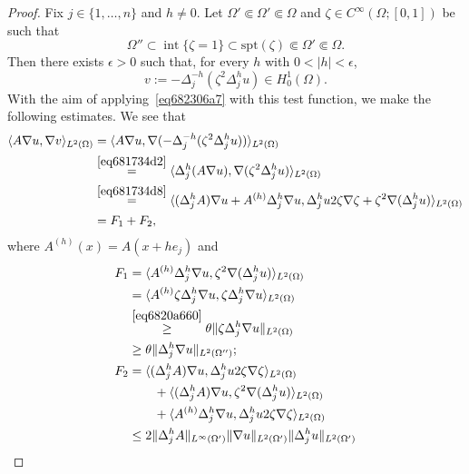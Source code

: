 \documentclass[a4paper,9pt]{amsart}
\newcommand{\spt}{\mathrm{spt}}
\newcommand{\grad}{\nabla}
\newcommand{\interior}{\operatorname{int}}
\theoremstyle{plain}
\theoremstyle{definition}
\theoremstyle{remark}
\begin{document}
\begin{proof}
	 Fix $j\in\{1,\dots,n\}$ and $h\neq0$.
	 Let $\Omega'\Subset\Omega'\Subset\Omega$ and $\zeta\in C^\infty(\Omega;[0,1])$ be such that
	\begin{equation}
		\Omega'' \subset\interior\{\zeta=1\} \subset\spt(\zeta) \Subset \Omega' \Subset\Omega .
	\end{equation}
	Then there exists $\epsilon>0$ such that, for every $h$ with $0<|h|<\epsilon$,
	\begin{equation}
		v := -\Delta_j^{-h} (\zeta^2 \Delta_j^h u) \in H^1_0(\Omega) .
	\end{equation}
	With the aim of applying~\eqref{eq682306a7} with this test function, we make the following estimates.
	We see that
	\begin{align}
		\langle A\grad u,\grad v \rangle_{L^2(\Omega)}
		&= \langle A\grad u,\grad (-\Delta_j^{-h} (\zeta^2 \Delta_j^h u)) \rangle_{L^2(\Omega)} \\
		&\overset{\eqref{eq681734d2}}= \langle \Delta_j^{h}(A\grad u),\grad (\zeta^2 \Delta_j^h u) \rangle_{L^2(\Omega)} \\
		&\overset{\eqref{eq681734d8}}= \langle (\Delta_j^{h}A)\grad u + A^{(h)} \Delta_j^{h}\grad u , 
			\Delta_j^h u 2\zeta\grad\zeta + \zeta^2 \grad(\Delta_j^h u) \rangle_{L^2(\Omega)} \\
		&= F_1 + F_2 ,
	\end{align}
	where $A^{(h)}(x) = A(x+he_j)$ and
	\begin{align}
		F_1
		&= \langle A^{(h)} \Delta_j^{h}\grad u , 
			\zeta^2 \grad(\Delta_j^h u) \rangle_{L^2(\Omega)} \\
		&= \langle A^{(h)} \zeta\Delta_j^{h}\grad u , 
			\zeta \Delta_j^h\grad u \rangle_{L^2(\Omega)} \\
		&\overset{\eqref{eq6820a660}}\ge \theta \|\zeta\Delta_j^{h}\grad u\|_{L^2(\Omega)} \\
		&\ge \theta \|\Delta_j^{h}\grad u\|_{L^2(\Omega'')} ; \\
		F_2
		&= \langle (\Delta_j^{h}A)\grad u , \Delta_j^h u 2\zeta\grad\zeta \rangle_{L^2(\Omega)} \\
		&\qquad	+ \langle (\Delta_j^{h}A)\grad u ,\zeta^2 \grad(\Delta_j^h u) \rangle_{L^2(\Omega)} \\
		&\qquad	+ \langle A^{(h)} \Delta_j^{h}\grad u , \Delta_j^h u 2\zeta\grad\zeta \rangle_{L^2(\Omega)} \\
		&\le 2 \|\Delta_j^{h}A\|_{L^\infty(\Omega')} \|\grad u \|_{L^2(\Omega')} \| \Delta_j^h u\|_{L^2(\Omega')}

\end{align}
\end{proof}
\end{document}
